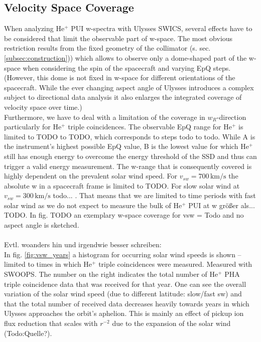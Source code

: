 \subsection{Velocity Space Coverage}
When analyzing $\mathrm{He^{+}}$ PUI w-spectra with Ulysses SWICS, several effects have to be considered that limit the observable part of w-space. The most obvious restriction results from the fixed geometry of the collimator (s. sec. \ref{subsec:construction})) which allows to observe only a dome-shaped part of the w-space when considering the spin of the spacecraft and varying EpQ steps. (However, this dome is not fixed in w-space for different orientations of the spacecraft.
While the ever changing aspect angle of Ulysses introduces a complex subject to directional data analysis it also enlarges the integrated coverage of velocity space over time.)\\
Furthermore, we have to deal with a limitation of the coverage in $w_R$-direction particularly for $\mathrm{He^{+}}$ triple coincidences. The observable EpQ range for $\mathrm{He^{+}}$ is limited to TODO to TODO, which corresponds to steps todo to todo. While A is the instrument's highest possible EpQ value, B is the lowest value for which $\mathrm{He^{+}}$ still has enough energy to overcome the energy threshold of the SSD and thus can trigger a valid energy measurement. 
The w-range that is consequently covered is highly dependent on the prevalent solar wind speed. For $v_{sw} = 700 \,\mathrm{km/s}$ the absolute w in a spacecraft frame is limited to TODO. For slow solar wind at $v_{sw} = 300 \,\mathrm{km/s}$ todo... . 
That means that we are limited to time periods with fast solar wind as we do not expect to measure the bulk of $\mathrm{He^{+}}$ PUI at w größer als... TODO. In fig. TODO an exemplary w-space coverage for vsw = Todo and no aspect angle is sketched.
\\ \\
Evtl. woanders hin und irgendwie besser schreiben: \\
In fig. \ref{fig:vsw_years} a histogram for occurring solar wind speeds is shown -- limited to times in which $\mathrm{He^{+}}$ triple coincidences were measured. Measured with SWOOPS. The number on the right indicates the total number of $\mathrm{He^{+}}$ PHA triple coincidence data that was received for that year. One can see the overall variation of the solar wind speed (due to different latitude: slow/fast sw) and that the total number of received data decreases heavily towards years in which Ulysses approaches the orbit's aphelion. This is mainly an effect of pickup ion flux reduction that scales with $r^{-2}$ due to the expansion of the solar wind (Todo:Quelle?).
